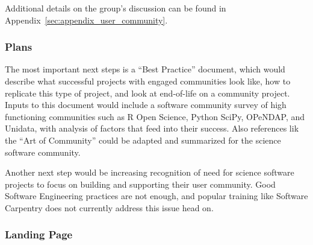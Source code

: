 Additional details on the group's discussion can be found in
Appendix~\ref{sec:appendix_user_community}.

\subsubsection{Plans}

The most important next steps is a ``Best Practice'' document, which would
describe what successful projects with engaged communities look like, how to
replicate this type of project, and look at end-of-life on a community project.
Inputs to this document would include a software community survey of high
functioning communities such as R Open Science, Python SciPy, OPeNDAP, and
Unidata, with analysis of factors that feed into their success. Also references
lik the ``Art of Community'' could be adapted and summarized for the science
software community.

Another next step would be increasing recognition of need for science software
projects to focus on building and supporting their user community. Good Software
Engineering practices are not enough, and popular training like Software
Carpentry does not currently address this issue head on.

\subsubsection{Landing Page}
